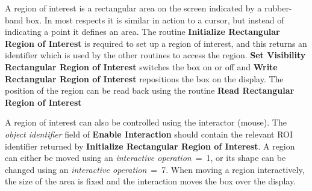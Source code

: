 \documentclass[11pt,nolof]{starlink}
\begin{document}
A region of interest is a rectangular area on the screen indicated by a
rubber-band box. In most respects it is similar in action to a cursor,
but instead of indicating a point it defines an area. The routine
\textbf{Initialize Rectangular Region of Interest} is required to set up a
region of interest, and this returns an identifier which is used by the
other routines to access the region. \textbf{Set Visibility Rectangular
Region of Interest} switches the box on or off and \textbf{Write Rectangular
Region of Interest} repositions the box on the display. The position of
the region can be read back using the routine \textbf{Read Rectangular
Region of Interest}

A region of interest can also be controlled using the interactor (mouse).
The \textit{object identifier} field of \textbf{Enable Interaction} should
contain the relevant ROI identifier returned by \textbf{Initialize Rectangular
Region of Interest}. A region can either be moved using an \textit{interactive
operation}~=~1, or its shape can be changed using an \textit{interactive
operation}~=~7. When moving a region interactively, the size of the area is
fixed and the interaction moves the box over the display.
\end{document}
